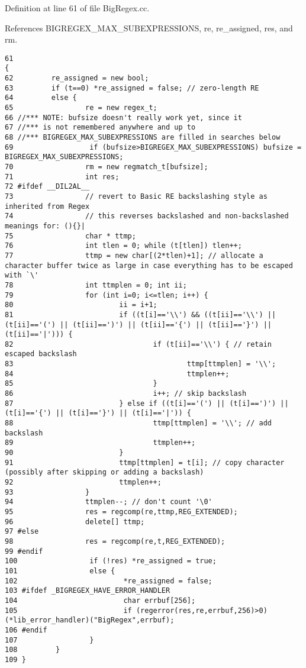 Definition at line 61 of file Big\-Regex.cc.

References BIGREGEX\_\-MAX\_\-SUBEXPRESSIONS, re, re\_\-assigned, res, and rm.



\footnotesize\begin{verbatim}61                                                                                {
62         re_assigned = new bool;
63         if (t==0) *re_assigned = false; // zero-length RE
64         else {
65                 re = new regex_t;
66 //*** NOTE: bufsize doesn't really work yet, since it
67 //*** is not remembered anywhere and up to
68 //*** BIGREGEX_MAX_SUBEXPRESSIONS are filled in searches below
69                  if (bufsize>BIGREGEX_MAX_SUBEXPRESSIONS) bufsize = BIGREGEX_MAX_SUBEXPRESSIONS;
70                 rm = new regmatch_t[bufsize];
71                 int res;
72 #ifdef __DIL2AL__
73                 // revert to Basic RE backslashing style as inherited from Regex
74                 // this reverses backslashed and non-backslashed meanings for: (){}|
75                 char * ttmp;
76                 int tlen = 0; while (t[tlen]) tlen++;
77                 ttmp = new char[(2*tlen)+1]; // allocate a character buffer twice as large in case everything has to be escaped with `\'
78                 int ttmplen = 0; int ii;
79                 for (int i=0; i<=tlen; i++) {
80                         ii = i+1;
81                         if ((t[i]=='\\') && ((t[ii]=='\\') || (t[ii]=='(') || (t[ii]==')') || (t[ii]=='{') || (t[ii]=='}') || (t[ii]=='|'))) {
82                                 if (t[ii]=='\\') { // retain escaped backslash
83                                         ttmp[ttmplen] = '\\';
84                                         ttmplen++;
85                                 }
86                                 i++; // skip backslash
87                         } else if ((t[i]=='(') || (t[i]==')') || (t[i]=='{') || (t[i]=='}') || (t[i]=='|')) {
88                                 ttmp[ttmplen] = '\\'; // add backslash
89                                 ttmplen++;
90                         }
91                         ttmp[ttmplen] = t[i]; // copy character (possibly after skipping or adding a backslash)
92                         ttmplen++;
93                 }
94                 ttmplen--; // don't count '\0'
95                 res = regcomp(re,ttmp,REG_EXTENDED);
96                 delete[] ttmp;
97 #else
98                 res = regcomp(re,t,REG_EXTENDED);
99 #endif
100                 if (!res) *re_assigned = true;
101                 else {
102                         *re_assigned = false;
103 #ifdef _BIGREGEX_HAVE_ERROR_HANDLER
104                         char errbuf[256];
105                         if (regerror(res,re,errbuf,256)>0) (*lib_error_handler)("BigRegex",errbuf);
106 #endif                  
107                 }
108         }
109 }
\end{verbatim}\normalsize 
{}
